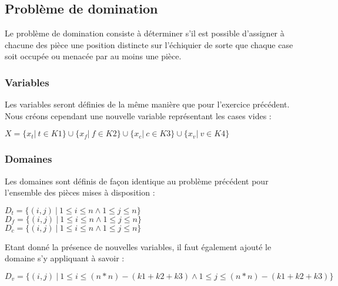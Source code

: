 \documentclass[a4paper]{article}
\begin{document}
\subsection{Problème de domination}
Le problème de domination consiste à déterminer s’il est possible d’assigner à chacune des pièce une position distincte sur l'échiquier de sorte que chaque case soit occupée ou menacée par au moins une pièce.

\begin{center}
\end{center}

\subsubsection{Variables}
Les variables seront définies de la même manière que pour l'exercice précédent. Nous créons cependant une nouvelle variable représentant les cases vides : 
\begin{center}
$X = \{ x_t | \ t \in K1 \}  \cup \{ x_f | \ f \in K2 \} \cup \{ x_c | \ c \in K3 \} \cup \{ x_v | \ v \in K4 \}$
\end{center}

\subsubsection{Domaines}
Les domaines sont définis de façon identique au problème précédent pour l'ensemble des pièces mises à disposition : 
\begin{center}
$D_t = \{ (i,j) \ | \ 1 \leq i \leq n \wedge 1 \leq j \leq n \}$ \\
$D_f = \{ (i,j) \ | \ 1 \leq i \leq n \wedge 1 \leq j \leq n \}$ \\
$D_c = \{ (i,j) \ | \ 1 \leq i \leq n \wedge 1 \leq j \leq n \}$ \\
\end{center}
Etant donné la présence de nouvelles variables, il faut également ajouté le domaine s'y appliquant à savoir : 
\begin{center}
$D_v = \{ (i,j) \ | \ 1 \leq i \leq (n*n)-(k1+k2+k3) \wedge 1 \leq j \leq (n*n)-(k1+k2+k3) \}$
\end{center}
\end{document}
